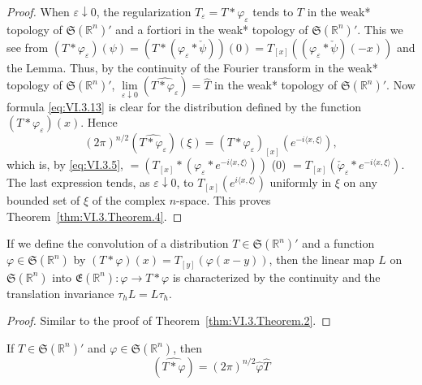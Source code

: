 \begin{proof}
 When $\varepsilon \downarrow 0$, the regularization $T_{\varepsilon} = T * \varphi_{\varepsilon}$ tends to $T$ in the weak* topology of $\mathfrak{S}(\mathbb{R}^{n})'$ and a fortiori in the weak* topology of $\mathfrak{S}(\mathbb{R}^{n})'$. This we see from $(T * \varphi_{\varepsilon})(\psi) = (T * (\varphi_{\varepsilon} * \check{\psi})) (0) = T_{[x]}((\varphi_{\varepsilon} * \check{\psi})(-x))$ and the Lemma. Thus, by the continuity of the Fourier transform in the weak* topology of $\mathfrak{S}(\mathbb{R}^{n})'$, $\lim\limits_{\varepsilon \downarrow 0} (\widehat{T * \varphi_{\varepsilon}}) = \hat{T}$ in the weak* topology of $\mathfrak{S}(\mathbb{R}^{n})'$. Now formula \eqref{eq:VI.3.13} is clear for the distribution defined by the function $(T * \varphi_{\varepsilon})(x)$. Hence 
\[
(2 \pi) ^{n/2} (\widehat {T * \varphi_{\varepsilon}}) (\xi) = (T * \varphi_{\varepsilon}) _{[x]} (e ^{- i \langle x, \xi \rangle}),
\]
which is, by \eqref{eq:VI.3.5}, $= (T_{[x]} * (\varphi_{\varepsilon} * e^{-i\langle x,\xi \rangle}))$ (0) $= T_{[x]}(\check{\varphi}_{\varepsilon} * e^{-i\langle x,\xi \rangle})$. The last expression tends, as $\varepsilon \downarrow 0$, to $T_{[x]}(e^{i\langle x,\xi \rangle})$ uniformly in $\xi$ on any bounded set of $\xi$ of the complex $n$-space. This proves Theorem~\ref{thm:VI.3.Theorem.4}. 
\end{proof}

\begin{theorem}\label{thm:VI.3.Theorem.5} If we define the convolution of a distribution $T \in \mathfrak{S}(\mathbb{R}^{n})'$ and a function $\varphi \in \mathfrak{S}(\mathbb{R}^{n})$ by $(T * \varphi)(x) = T_{[y]}(\varphi(x - y))$, then the linear map $L$ on $\mathfrak{S}(\mathbb{R}^{n})$ into $\mathfrak{E}(\mathbb{R}^{n}): \varphi \to T * \varphi$ is characterized by the continuity and the translation invariance $\tau_h L = L\tau_h$. 
\end{theorem}

\begin{proof}
 Similar to the proof of Theorem~\ref{thm:VI.3.Theorem.2}. 
\end{proof}

\begin{theorem}\label{thm:VI.3.Theorem.6} If $T \in \mathfrak{S}(\mathbb{R}^{n})'$ and $\varphi \in \mathfrak{S}(\mathbb{R}^{n})$, then 
\begin{equation}\label{eq:VI.3.14}
(\widehat {T * \varphi}) = (2 \pi) ^{n/2} \hat {\varphi} \hat {T}
\end{equation}
\end{theorem}

